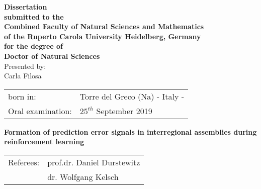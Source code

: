 \thispagestyle{plain}

\vspace*{1cm}

\begin{center}
\begin{large}
{\textbf{Dissertation\\submitted to the\\Combined Faculty of Natural Sciences and Mathematics\\of the Ruperto Carola University Heidelberg, Germany\\for the degree of\\Doctor of Natural Sciences}}\\
\vspace{10cm}
Presented by:\\ Carla Filosa\\
\vspace{1cm}
\begin{tabular}{ll}
born in: & Torre del Greco (Na) - Italy - \\
Oral examination: &  $25^{th}$ September 2019 \\
\end{tabular}
\end{large}
\end{center}
\clearpage
\thispagestyle{plain}

\begin{center}
\begin{large}
\vspace*{3cm}
{\Huge \textbf{Formation of prediction error signals in interregional assemblies during reinforcement learning}}

\vspace*{10cm}

\begin{tabular}{ll}
Referees: & prof.dr. Daniel Durstewitz \\
&  dr. Wolfgang Kelsch \\
\end{tabular}
\end{large}
\end{center}
\afterpage{\blankpage}



